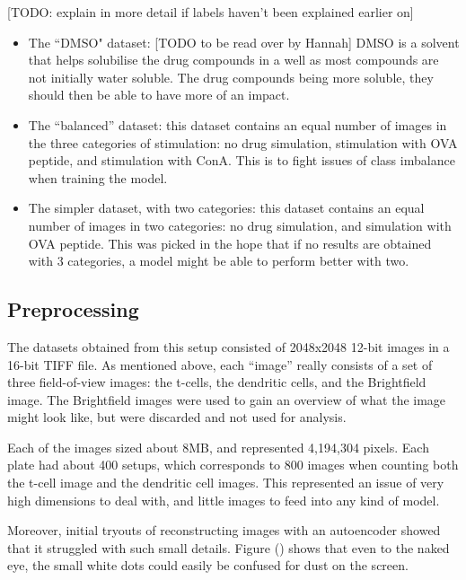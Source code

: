 \documentclass{l4proj}
\begin{document}
[TODO: explain in more detail if labels haven't been explained earlier on]
\begin{itemize}
    \item The ``DMSO" dataset: [TODO to be read over by Hannah] DMSO is a solvent that helps solubilise the drug compounds in a well as most compounds are not initially water soluble. The drug compounds being more soluble, they should then be able to have more of an impact.
    \item The ``balanced” dataset: this dataset contains an equal number of images in the three categories of stimulation: no drug simulation, stimulation with OVA peptide, and stimulation with ConA. This is to fight issues of class imbalance when training the model.
    \item The simpler dataset, with two categories: this  dataset contains an equal number of images in two categories: no drug simulation, and simulation with OVA peptide. This was picked in the hope that if no results are obtained with 3 categories, a model might be able to perform better with two.
\end{itemize}

\subsection{Preprocessing}
The datasets obtained from this setup consisted of 2048x2048 12-bit images in a 16-bit TIFF file. As mentioned above, each ``image” really consists of a set of three field-of-view images: the t-cells, the dendritic cells, and the Brightfield image. The Brightfield images were used to gain an overview of what the image might look like, but were discarded and not used for analysis.


\bigskip
Each of the images sized about 8MB, and represented 4,194,304 pixels. Each plate had about 400 setups, which corresponds to 800 images when counting both the t-cell image and the dendritic cell images. This represented an issue of very high dimensions to deal with, and little images to feed into any kind of model.

\bigskip
Moreover, initial tryouts of reconstructing images with an autoencoder showed that it struggled with such small details. Figure () shows that even to the naked eye, the small white dots could easily be confused for dust on the screen.
\end{document}
